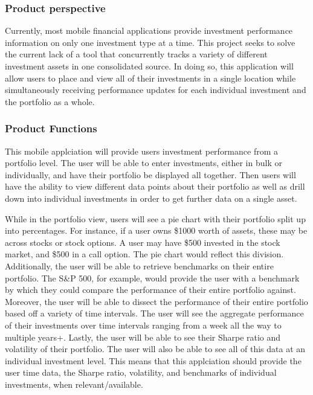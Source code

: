 \documentclass[onecolumn, draftclsnofoot,10pt, compsoc]{IEEEtran}
\begin{document}
\subsubsection{Product perspective}

Currently, most mobile financial applications provide investment performance information on only one investment type at a time. 
This project seeks to solve the current lack of a tool that concurrently tracks a variety of different investment assets in 
one consolidated source. In doing so, this application will allow users to place and view all of their investments in a single location 
while simultaneously receiving performance updates for each individual investment and the portfolio as a whole.

\subsubsection{Product Functions}
This mobile applciation will provide users investment performance from a portfolio level. The user will be able to enter investments, either 
in bulk or individually, and have their portfolio be displayed all together. Then users will have the ability to view different data
points about their portfolio as well as drill down into individual investments in order to get further data on a single asset.

While in the portfolio view, users will see a pie chart with their portfolio split up into percentages. 
For instance, if a user owns \$1000 worth of assets, these may be across stocks or stock options. A user may have \$500 invested in the stock market, 
and \$500 in a call option. The pie chart would reflect this division. Additionally, the user will be able to retrieve benchmarks on their entire portfolio. 
The S\&P 500, for example, would provide the user with a benchmark by which they could compare the performance of their entire portfolio against. 
Moreover, the user will be able to dissect the performance of their entire portfolio based off a variety of time intervals. The user will see the aggregate 
performance of their investments over time intervals ranging from a week all the way to multiple years+. Lastly, the user will be able to see their Sharpe ratio and volatility of their portfolio. 
The user will also be able to see all of this data at an individual investment level. This means that this applciation should provide the user 
time data, the Sharpe ratio, volatility, and benchmarks of individual investments, when relevant/available.
\end{document}
